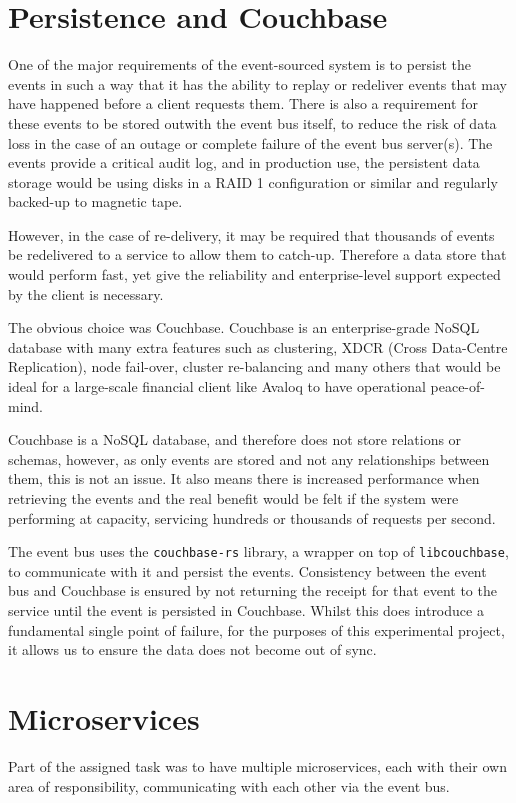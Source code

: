 \documentclass{l3proj}
\begin{document}
\section{Persistence and Couchbase}
\label{sec:persistence}
One of the major requirements of the event-sourced system is to persist the events in such a way that it has the ability to replay or redeliver events that may have happened before a client requests them. There is also a requirement for these events to be stored outwith the event bus itself, to reduce the risk of data loss in the case of an outage or complete failure of the event bus server(s). The events provide a critical audit log, and in production use, the persistent data storage would be using disks in a RAID 1 configuration or similar and regularly backed-up to magnetic tape.

However, in the case of re-delivery, it may be required that thousands of events be redelivered to a service to allow them to catch-up. Therefore a data store that would perform fast, yet give the reliability and enterprise-level support expected by the client is necessary.

The obvious choice was Couchbase. Couchbase is an enterprise-grade NoSQL database with many extra features such as clustering, XDCR (Cross Data-Centre Replication), node fail-over, cluster re-balancing and many others that would be ideal for a large-scale financial client like Avaloq to have operational peace-of-mind.

Couchbase is a NoSQL database, and therefore does not store relations or schemas, however, as only events are stored and not any relationships between them, this is not an issue. It also means there is increased performance when retrieving the events and the real benefit would be felt if the system were performing at capacity, servicing hundreds or thousands of requests per second.

The event bus uses the \texttt{couchbase-rs} library, a wrapper on top of \texttt{libcouchbase}, to communicate with it and persist the events. Consistency between the event bus and Couchbase is ensured by not returning the receipt for that event to the service until the event is persisted in Couchbase. Whilst this does introduce a fundamental single point of failure, for the purposes of this experimental project, it allows us to ensure the data does not become out of sync.

\section{Microservices}
\label{sec:microservices}
Part of the assigned task was to have multiple microservices, each with their own area of responsibility, communicating with each other via the event bus.
\end{document}

